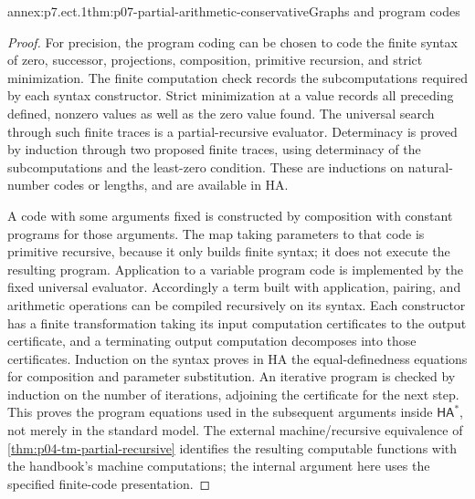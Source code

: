 \begin{annexitem}{annex:p7.ect.1}{thm:p07-partial-arithmetic-conservative}{Graphs and program codes}
\begin{proof}
For precision, the program coding can be chosen to code the finite
syntax of zero, successor, projections, composition, primitive
recursion, and strict minimization. The finite computation check
records the subcomputations required by each syntax constructor.
Strict minimization at a value records all preceding defined,
nonzero values as well as the zero value found. The universal search
through such finite traces is a partial-recursive evaluator.
Determinacy is proved by induction through two proposed finite
traces, using determinacy of the subcomputations and the least-zero
condition. These are inductions on natural-number codes or lengths,
and are available in HA.

A code with some arguments fixed is constructed by composition with
constant programs for those arguments. The map taking parameters
to that code is primitive recursive, because it only builds finite
syntax; it does not execute the resulting program. Application to a
variable program code is implemented by the fixed universal evaluator.
Accordingly a term built with application, pairing, and arithmetic
operations can be compiled recursively on its syntax. Each constructor
has a finite transformation taking its input computation certificates
to the output certificate, and a terminating output computation
decomposes into those certificates. Induction on the syntax proves
in HA the equal-definedness equations for composition and parameter
substitution. An iterative program is checked by induction on the
number of iterations, adjoining the certificate for the next step.
This proves the program equations used in the subsequent arguments
inside \(\mathsf{HA}^{\ast}\), not merely in the standard model.
The external machine/recursive equivalence of
\cref{thm:p04-tm-partial-recursive} identifies the resulting computable
functions with the handbook's machine computations; the internal
argument here uses the specified finite-code presentation.
\end{proof}
\end{annexitem}

